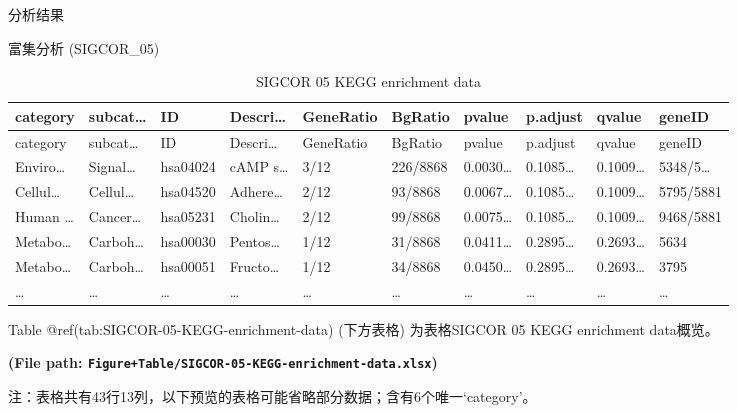 \documentclass[
  ignorenonframetext,
]{beamer}
\begin{document}
\begin{frame}[fragile]{分析结果}
\begin{block}{富集分析 (SIGCOR\_05)}
\begin{center}
\begin{tcolorbox}[colback=gray!10, colframe=gray!50, width=0.9\linewidth, arc=1mm, boxrule=0.5pt]
\vspace{2em}
\end{tcolorbox}
\end{center}

\begin{center}\vspace{1.5cm}\end{center}

\begin{center}\vspace{1.5cm}\end{center}

\begin{longtable}[]{@{}llllllllll@{}}
\caption{SIGCOR 05 KEGG enrichment data}\tabularnewline
\toprule
category & subcat\ldots{} & ID & Descri\ldots{} & GeneRatio & BgRatio &
pvalue & p.adjust & qvalue & geneID\tabularnewline
\midrule
\endfirsthead
\toprule
category & subcat\ldots{} & ID & Descri\ldots{} & GeneRatio & BgRatio &
pvalue & p.adjust & qvalue & geneID\tabularnewline
\midrule
\endhead
Enviro\ldots{} & Signal\ldots{} & hsa04024 & cAMP s\ldots{} & 3/12 &
226/8868 & 0.0030\ldots{} & 0.1085\ldots{} & 0.1009\ldots{} &
5348/5\ldots{}\tabularnewline
Cellul\ldots{} & Cellul\ldots{} & hsa04520 & Adhere\ldots{} & 2/12 &
93/8868 & 0.0067\ldots{} & 0.1085\ldots{} & 0.1009\ldots{} &
5795/5881\tabularnewline
Human \ldots{} & Cancer\ldots{} & hsa05231 & Cholin\ldots{} & 2/12 &
99/8868 & 0.0075\ldots{} & 0.1085\ldots{} & 0.1009\ldots{} &
9468/5881\tabularnewline
Metabo\ldots{} & Carboh\ldots{} & hsa00030 & Pentos\ldots{} & 1/12 &
31/8868 & 0.0411\ldots{} & 0.2895\ldots{} & 0.2693\ldots{} &
5634\tabularnewline
Metabo\ldots{} & Carboh\ldots{} & hsa00051 & Fructo\ldots{} & 1/12 &
34/8868 & 0.0450\ldots{} & 0.2895\ldots{} & 0.2693\ldots{} &
3795\tabularnewline
\ldots{} & \ldots{} & \ldots{} & \ldots{} & \ldots{} & \ldots{} &
\ldots{} & \ldots{} & \ldots{} & \ldots{}\tabularnewline
\bottomrule
\end{longtable}

Table @ref(tab:SIGCOR-05-KEGG-enrichment-data) (下方表格) 为表格SIGCOR
05 KEGG enrichment data概览。

\textbf{(File path:
\texttt{Figure+Table/SIGCOR-05-KEGG-enrichment-data.xlsx})}

\begin{center}\begin{tcolorbox}[colback=gray!10, colframe=gray!50, width=0.9\linewidth, arc=1mm, boxrule=0.5pt]注：表格共有43行13列，以下预览的表格可能省略部分数据；含有6个唯一`category'。
\end{tcolorbox}
\end{center}


\end{block}
\end{frame}
\end{document}
